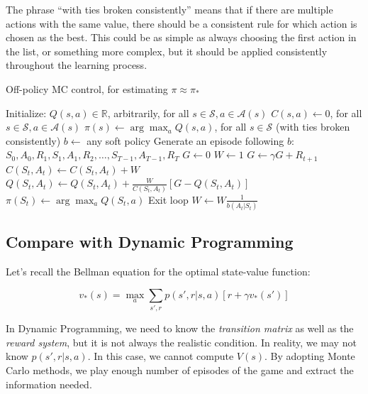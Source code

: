 The phrase ``with ties broken consistently'' means that if there are multiple actions with the same value, there should be a consistent rule for which action is chosen as the best. This could be as simple as always choosing the first action in the list, or something more complex, but it should be applied consistently throughout the learning process.

\begin{algorithm}
    \caption{Off-policy MC control, for estimating $\pi \approx \pi_*$}\label{alg:MC_off_policy}
    \begin{algorithmic}
        \State Initialize:
        \State \hspace{\algorithmicindent} $Q(s,a) \in \mathbb{R}$, arbitrarily, for all $s \in \mathcal{S}, a \in \mathcal{A}(s)$
        \State \hspace{\algorithmicindent} $C(s,a) \leftarrow 0$, for all $s \in \mathcal{S}, a \in \mathcal{A}(s)$
        \State \hspace{\algorithmicindent} $\pi(s) \leftarrow \arg\max_a Q(s,a)$, for all $s \in \mathcal{S}$ (with ties broken consistently)
        \State $b \leftarrow$ any soft policy
        \State Generate an episode following $b$: $S_0, A_0, R_1, S_1, A_1, R_2, \dots, S_{T-1}, A_{T-1}, R_T$
        \State $G \leftarrow 0$
        \State $W \leftarrow 1$
        \State $G \leftarrow \gamma G + R_{t+1}$
        \State $C(S_t, A_t) \leftarrow C(S_t, A_t) + W$
        \State $Q(S_t, A_t) \leftarrow Q(S_t, A_t) + \frac{W}{C(S_t, A_t)} \left[ G - Q(S_t, A_t) \right]$
        \State $\pi(S_t) \leftarrow \arg\max_a Q(S_t, a)$
        \State Exit loop
        \EndIf
        \State $W \leftarrow W \frac{1}{b(A_t|S_t)}$
        \EndFor
        \EndLoop
    \end{algorithmic}
\end{algorithm}

\subsection{Compare with Dynamic Programming}

Let's recall the Bellman equation for the optimal state-value function:

\[v_*(s) = \max_a\sum_{s', r} p(s',r|s,a) \left[ r + \gamma v_*(s')\right]\]

In Dynamic Programming, we need to know the \emph{transition matrix} as well as the \emph{reward system}, but it is not always the realistic condition. In reality, we may not know $p(s',r|s,a)$. In this case, we cannot compute $V(s)$. By adopting Monte Carlo methods, we play enough number of episodes of the game and extract the information needed.

